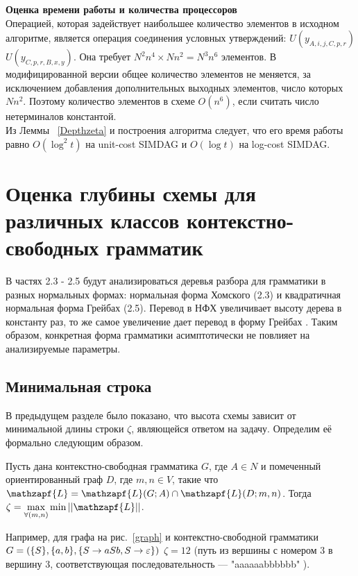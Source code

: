 \documentclass{spbau-diploma}
\begin{document}
\textbf {Оценка  времени работы и количества процессоров}
\\Операцией, которая задействует наибольшее количество элементов в исходном алгоритме, является операция соединения условных утверждений: \textit{$U(y_{A,i,j,C,p,r})$} \text{$ \land $} \textit{$U(y_{C,p,r,B,x,y})$}. Она требует $N^2n^4 \times Nn^2 = N^3n^6$ элементов. В модифицированной версии общее количество элементов не меняется, за исключением добавления дополнительных выходных элементов, число которых $Nn^2$. Поэтому количество элементов в схеме $O(n^6)$, если считать число нетерминалов константой. 
\\Из Леммы ~\ref{Depthzeta} и построения алгоритма следует, что его время работы равно $O(\log^2t)$ на unit-cost SIMDAG и $O(\log t)$ на log-cost SIMDAG.

\section {Оценка глубины схемы для различных классов контекстно-свободных грамматик}В частях 2.3 - 2.5 будут анализироваться деревья разбора для грамматики в разных нормальных формах: нормальная форма Хомского (2.3) и квадратичная нормальная форма Грейбах (2.5). Перевод в НФХ увеличивает высоту дерева в константу раз, то же самое увеличение дает перевод в форму Грейбах \cite{Kelemenova}. Таким образом, конкретная форма грамматики асимптотически не повлияет на анализируемые параметры.
\subsection{Минимальная строка}
В предыдущем разделе было показано, что высота схемы зависит от минимальной длины строки $\zeta$, являющейся ответом на задачу. Определим её формально  следующим образом.

Пусть дана контекстно-свободная грамматика $G$, где $A \in N$  и помеченный ориентированный граф $D$, где $m, n \in V$, такие что  $\mathzapf{L} = \mathzapf{L}(G; A) \cap  \mathzapf{L}(D; m, n)$. Тогда $\zeta = \max\limits_{\forall(m,n)}\min ||\mathzapf{L}||$.

Например, для графа на рис.~\ref{graph} и контекстно-свободной грамматики $G = (\{S\}, \{a, b\},\\ \{S \rightarrow aSb, 
S \rightarrow \varepsilon\})$ $\zeta = 12$ (путь из вершины с номером 3 в вершину 3, соответствующая последовательность  --- "aaaaaabbbbbb" ).
\end{document}
